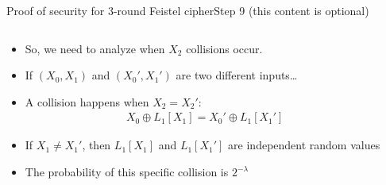 \documentclass[aspectratio=169, lualatex, handout]{beamer}
\begin{document}
	\begin{frame}{Proof of security for 3-round Feistel cipher}{Step 9 (this content is optional)}
		\begin{columns}[c]
			\begin{column}{0.6\textwidth}
				\begin{itemize}
					\item So, we need to analyze when $X_2$ collisions occur.
					\item If $(X_0, X_1)$ and $(X_0', X_1')$ are two different inputs\ldots
					\item A collision happens when $X_2 = X_2'$:
					      \begin{align*}
						      X_0 \oplus L_1[X_1] = X_0' \oplus L_1[X_1']
					      \end{align*}
					\item If $X_1 \neq X_1'$, then $L_1[X_1]$ and $L_1[X_1']$ are independent random values
					\item The probability of this specific collision is $2^{-\lambda}$
				\end{itemize}
			\end{column}
			\begin{column}{0.4\textwidth}
				\vspace{-1.5cm}
				\begin{center}
				\end{center}
			\end{column}
		\end{columns}
	\end{frame}
\end{document}
